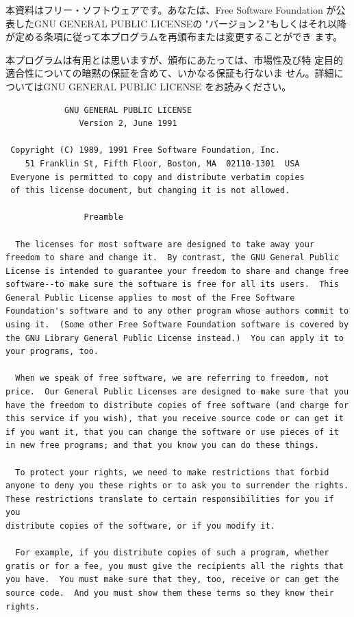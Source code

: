 \documentclass[mingoth,a4paper]{jsarticle}
\begin{document}
本資料はフリー・ソフトウェアです。あなたは、Free Software
Foundation が公表したGNU GENERAL PUBLIC LICENSEの "バージョン２"もしくはそれ以降
が定める条項に従って本プログラムを再頒布または変更することができ
ます。

本プログラムは有用とは思いますが、頒布にあたっては、市場性及び特
定目的適合性についての暗黙の保証を含めて、いかなる保証も行ないま
せん。詳細についてはGNU GENERAL PUBLIC LICENSE をお読みください。

\begin{multicols}{2}
 \begin{fontsize}{6}{6}
 \begin{verbatim}
            GNU GENERAL PUBLIC LICENSE
               Version 2, June 1991

 Copyright (C) 1989, 1991 Free Software Foundation, Inc.
    51 Franklin St, Fifth Floor, Boston, MA  02110-1301  USA
 Everyone is permitted to copy and distribute verbatim copies
 of this license document, but changing it is not allowed.

                Preamble

  The licenses for most software are designed to take away your
freedom to share and change it.  By contrast, the GNU General Public
License is intended to guarantee your freedom to share and change free
software--to make sure the software is free for all its users.  This
General Public License applies to most of the Free Software
Foundation's software and to any other program whose authors commit to
using it.  (Some other Free Software Foundation software is covered by
the GNU Library General Public License instead.)  You can apply it to
your programs, too.

  When we speak of free software, we are referring to freedom, not
price.  Our General Public Licenses are designed to make sure that you
have the freedom to distribute copies of free software (and charge for
this service if you wish), that you receive source code or can get it
if you want it, that you can change the software or use pieces of it
in new free programs; and that you know you can do these things.

  To protect your rights, we need to make restrictions that forbid
anyone to deny you these rights or to ask you to surrender the rights.
These restrictions translate to certain responsibilities for you if you
distribute copies of the software, or if you modify it.

  For example, if you distribute copies of such a program, whether
gratis or for a fee, you must give the recipients all the rights that
you have.  You must make sure that they, too, receive or can get the
source code.  And you must show them these terms so they know their
rights.


\end{verbatim}
\end{fontsize}
\end{multicols}
\end{document}
